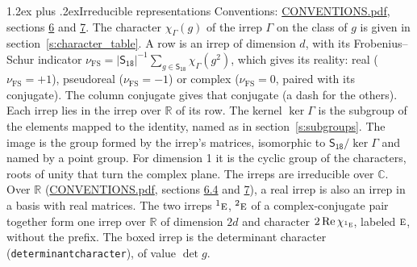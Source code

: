 \documentclass[10pt,a4paper]{article}
\makeatletter
\renewcommand\section{\@startsection{section}{1}{\z@}{-3ex plus -1ex minus -.2ex}%
  {1.2ex plus .2ex}{\normalfont\large\sffamily\bfseries\color{parttitle}}}
\numberwithin{equation}{section}
\newcommand{\grp}[1]{\mathsf{#1}}
\newcommand{\irr}[1]{\text{\normalfont\scshape #1}}
\newcommand{\conjpair}[1]{{}^{#1}}
\newcommand{\irchar}[1]{\chi_{#1}}
\newcommand{\fsind}{\nu_{\mathrm{FS}}}
\makeatother
\begin{document}
\section{Irreducible representations}\label{s:irreps}
Conventions: \href{../../CONVENTIONS.pdf}{CONVENTIONS.pdf}, sections \href{../../CONVENTIONS.pdf\#conv.6}{6} and \href{../../CONVENTIONS.pdf\#conv.7}{7}.
\leavevmode\label{n:function.character}\label{n:irrep.Gamma}The character $\irchar{\Gamma}(g)$ of the irrep $\Gamma$ on the class of $g$ is given in section~\ref{s:character_table}.
\leavevmode\label{n:index.dimension}\label{n:index.frobenius}\label{n:head.irrep}\label{n:head.reality}A row is an irrep of dimension $d$, with its Frobenius--Schur indicator $\fsind = |\grp{S_{18}}|^{-1}\allowbreak\sum_{g\in\grp{S_{18}}}\irchar{\Gamma}(g^2)$, which gives its reality: real ($\fsind = +1$), pseudoreal ($\fsind = -1$) or complex ($\fsind = 0$, paired with its conjugate). \label{n:head.conjugate}The column conjugate gives that conjugate (a dash for the others). \label{n:head.over.real}Each irrep lies in the irrep over $\mathbb{R}$ of its row. \label{n:head.kernel}The kernel $\ker\Gamma$ is the subgroup of the elements mapped to the identity, named as in section~\ref{s:subgroups}. \label{n:head.image}The image is the group formed by the irrep's matrices, isomorphic to $\grp{S_{18}}/\ker\Gamma$ and named by a point group. For dimension 1 it is the cyclic group of the characters, roots of unity that turn the complex plane. The irreps are irreducible over $\mathbb{C}$. Over $\mathbb{R}$ (\href{../../CONVENTIONS.pdf}{CONVENTIONS.pdf}, sections \href{../../CONVENTIONS.pdf\#conv.6.4}{6.4} and \href{../../CONVENTIONS.pdf\#conv.7}{7}), a real irrep is also an irrep in a basis with real matrices. The two irreps $\conjpair{1}\irr{e}$, $\conjpair{2}\irr{e}$ of a complex-conjugate pair together form one irrep over $\mathbb{R}$ of dimension $2d$ and character $2\operatorname{Re}\irchar{\conjpair{1}\irr{e}}$, labeled $\irr{e}$, without the prefix. \label{n:mark.determinant}The boxed irrep is the determinant character (\texttt{determinantcharacter}), of value $\det g$.
\setlength{\emergencystretch}{2em}\par\setlength{\emergencystretch}{0pt}
\end{document}
